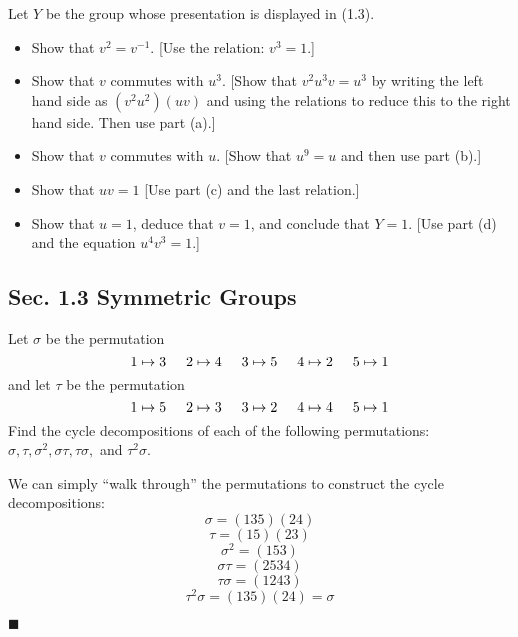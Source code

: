 \documentclass[12pt]{article}
\renewcommand{\qed}{\hfill$\blacksquare$}
\renewenvironment{proof}{\begin{addmargin}[1em]{0em}\begin{newproof}}{\end{newproof}\end{addmargin}\qed}
\newenvironment{problem}[2][Exercise]{\begin{trivlist}
\item[\hskip \labelsep {\bfseries #1}\hskip \labelsep {\bfseries #2.}]}{\end{trivlist}}
\begin{document}
\begin{problem}{1.2.18}
Let $Y$ be the group whose presentation is displayed in (1.3).
\begin{itemize}
    \item Show that $v^2=v^{-1}$. [Use the relation: $v^3=1$.]
    \item Show that $v$ commutes with $u^3$. [Show that $v^2u^3v=u^3$ by writing the left hand side as $\left(v^2u^2\right)\left(uv\right)$ and using the relations to reduce this to the right hand side. Then use part (a).]
    \item Show that $v$ commutes with $u$. [Show that $u^9=u$ and then use part (b).]
    \item Show that $uv=1$ [Use part (c) and the last relation.]
    \item Show that $u=1$, deduce that $v=1$, and conclude that $Y=1$. [Use part (d) and the equation $u^4v^3=1$.]
\end{itemize}
\end{problem}








\subsection*{Sec. 1.3 Symmetric Groups}

\begin{problem}{1.3.1}
Let $\sigma$ be the permutation
$$ 1\mapsto 3 \hspace{5mm} 2\mapsto 4 \hspace{5mm} 3\mapsto 5 \hspace{5mm} 4\mapsto 2 \hspace{5mm} 5\mapsto 1 $$ and let $\tau$ be the permutation
$$ 1\mapsto 5 \hspace{5mm} 2\mapsto 3 \hspace{5mm} 3\mapsto 2 \hspace{5mm} 4\mapsto 4 \hspace{5mm} 5\mapsto 1 $$ Find the cycle decompositions of each of the following permutations: $\sigma, \tau, \sigma^2, \sigma\tau, \tau\sigma, $ and $\tau^2\sigma$.
\end{problem}
\begin{proof}
We can simply ``walk through'' the permutations to construct the cycle decompositions:
$$ \sigma = \left(135\right)\left(24\right) $$
$$ \tau = \left(15\right)\left(23\right) $$
$$ \sigma^2 = \left(153\right) $$
$$ \sigma \tau = \left(2534\right) $$
$$ \tau \sigma = \left(1243\right) $$
$$ \tau^2 \sigma = \left(135\right)\left(24\right) = \sigma $$
\end{proof}
\end{document}
